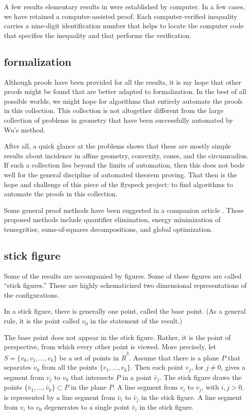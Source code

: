 A few results elementary results in \cite{DCG} were established
by computer.  In a few cases, we have retained a computer-assisted
proof.  Each computer-verified inequality carries a nine-digit 
identification
number  that helps to locate the computer code
that specifies the inequality and that performs the verification.

\subsection{formalization}

Although proofs have been provided for all the results, it is
my hope that other proofs might be found that are better adapted
to formalization.  In the best of all possible
worlds, we might hope for
algorithms that entirely automate the proofs in this collection.
This collection is not altogether different from the large collection
of problems in geometry that have been successfully automated
by Wu's method. 

After all, a quick glance at the problems shows that these are
mostly simple results about incidence in affine geometry, convexity, cones,
and the circumradius.  If such a collection lies beyond
the limits of automation, then this does not bode well for 
the general discipline of automated theorem proving.  That then
is the hope and challenge of this piece of the flyspeck project:
to find algorithms to automate the proofs in this collection.


Some general proof methods have been suggested
in a companion article \cite{method}.  These proposed methods include
quantifier elimination, energy minimization of tensegrities,
sums-of-squares decompositions, and global optimization.  


\subsection{stick figure}

Some of the results are accompanied by figures.  Some of these
figures are called ``stick figures.'' These are highly schematicized
two dimensional representations of the configurations.

In a stick figure, there is generally one point, called the
base point.  (As a general rule, it is the point called $v_0$ in
the statement of the result.) 

The base point does not appear in the stick figure.  Rather, it
is the point of perspective, from which every other point is viewed.
More precisely, let $S=\{v_0,v_1,\ldots,v_k\}$ be a set of points
in $\ring{R}^3$.  Assume that there is a plane $P$ that separates
$v_0$ from all the points $\{v_1,\ldots,v_k\}$.  Then each point
$v_j$, for $j\ne 0$, gives a segment from $v_j$ to $v_0$ that intersects
$P$ in a point $\bar v_j$.  The stick figure draws the points
$\{\bar v_1,\ldots ,\bar v_k\}\subset P$ in the plane $P$.
A line segment from $v_i$ to $v_j$, with $i,j>0$, is represented by a
line segment from $\bar v_i$ to $\bar v_j$ in the stick figure.
A line segment from $v_i$ to $v_0$ degenerates to a single point $\bar v_i$
in the stick figure.

